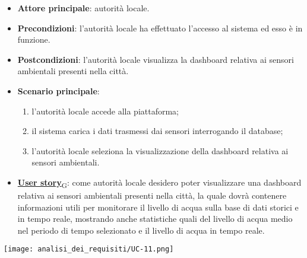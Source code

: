 \begin{itemize}
	\item \textbf{Attore principale}: autorità locale.
	\item \textbf{Precondizioni}: l'autorità locale ha effettuato l'accesso al sistema ed esso è in funzione.
	\item \textbf{Postcondizioni}: l'autorità locale visualizza la dashboard relativa
	      ai sensori ambientali presenti nella città.
	\item \textbf{Scenario principale}:
	      \begin{enumerate}
		      \item l'autorità locale accede alla piattaforma;
		      \item il sistema carica i dati trasmessi dai sensori interrogando il database;
		      \item l'autorità locale seleziona la visualizzazione della dashboard relativa ai sensori ambientali.
	      \end{enumerate}
	\item \href{https://7last.github.io/docs/rtb/documentazione-interna/glossario\#user-story}{\textbf{User story}\textsubscript{G}}:
	      come autorità locale desidero poter visualizzare una dashboard relativa ai sensori ambientali presenti nella città, la quale
	      dovrà contenere informazioni utili per monitorare il livello di acqua sulla base di dati storici e in tempo reale, mostrando
	      anche statistiche quali del livello di acqua medio nel periodo di tempo selezionato e il livello di acqua in tempo reale.
\end{itemize}
\begin{center}
	\texttt{[image: analisi\_dei\_requisiti/UC-11.png]}
\end{center}


